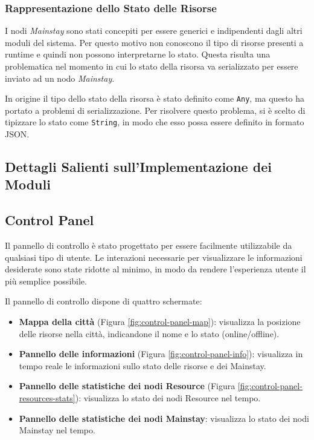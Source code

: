 \documentclass[12pt]{article}
\begin{document}
\subsubsection{Rappresentazione dello Stato delle Risorse}

I nodi \textit{Mainstay} sono stati concepiti per essere generici e indipendenti dagli altri moduli del sistema. Per questo motivo non conoscono il tipo di risorse presenti a runtime e quindi non possono interpretarne lo stato. Questa risulta una problematica nel momento in cui lo stato della risorsa va serializzato per essere inviato ad un nodo \textit{Mainstay}.

In origine il tipo dello stato della risorsa è stato definito come \verb|Any|, ma questo ha portato a problemi di serializzazione. Per risolvere questo problema, si è scelto di tipizzare lo stato come \verb|String|, in modo che esso possa essere definito in formato JSON.

\subsection{Dettagli Salienti sull'Implementazione dei Moduli}

\subsection{Control Panel}

Il pannello di controllo è stato progettato per essere facilmente utilizzabile da qualsiasi tipo di utente. Le interazioni necessarie per visualizzare le informazioni desiderate sono state ridotte al minimo, in modo da rendere l'esperienza utente il più semplice possibile.

Il pannello di controllo dispone di quattro schermate:

\begin{itemize}
    \item \textbf{Mappa della città} (Figura \ref{fig:control-panel-map}): visualizza la posizione delle risorse nella città, indicandone il nome e lo stato (online/offline).
    \item \textbf{Pannello delle informazioni} (Figura \ref{fig:control-panel-info}): visualizza in tempo reale le informazioni sullo stato delle risorse e dei Mainstay.
    \item \textbf{Pannello delle statistiche dei nodi Resource} (Figura \ref{fig:control-panel-resources-stats}): visualizza lo stato dei nodi Resource nel tempo.
    \item \textbf{Pannello delle statistiche dei nodi Mainstay}: visualizza lo stato dei nodi Mainstay nel tempo.
\end{itemize}
\end{document}
